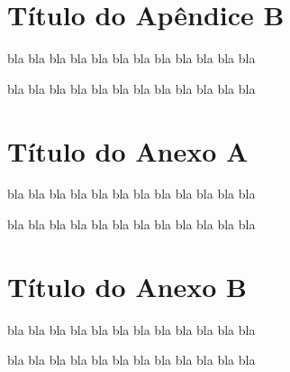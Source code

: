 \documentclass[12pt,a4paper,espaco=umemeio,noindentfirst,oneside,openany,tocpage=plain,pnumromarab,ruledheader,time,anapcustomindent]{abntex2ppgsi}
\begin{document}

\chapter{Título do Apêndice B}

bla bla bla bla bla bla bla bla bla bla bla bla

bla bla bla bla bla bla bla bla bla bla bla bla


\annex


\chapter{Título do Anexo A}

bla bla bla bla bla bla bla bla bla bla bla bla

bla bla bla bla bla bla bla bla bla bla bla bla


\chapter{Título do Anexo B}

bla bla bla bla bla bla bla bla bla bla bla bla

bla bla bla bla bla bla bla bla bla bla bla bla

\end{document}

